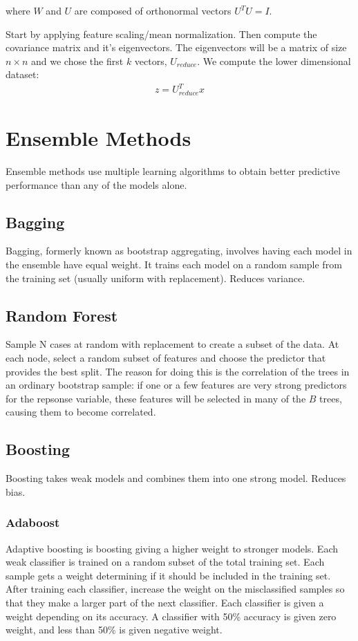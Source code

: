 \documentclass[12pt]{article}
\begin{document}
where $W$ and $U$ are composed of orthonormal vectors $U^TU=I$.  

Start by applying feature scaling/mean normalization. Then compute the covariance matrix and it's eigenvectors. The eigenvectors will be a matrix of size $n\times n$ and we chose the first $k$ vectors, $U_{reduce}$. We compute the lower dimensional dataset:
\begin{align*}
z = U_{reduce}^Tx
\end{align*}

\section{Ensemble Methods}
Ensemble methods use multiple learning algorithms to obtain better predictive performance than any of the models alone.

\subsection{Bagging}
Bagging, formerly known as bootstrap aggregating, involves having each model in the ensemble have equal weight. It trains each model on a random sample from the training set (usually uniform with replacement). Reduces variance.

\subsection{Random Forest}
Sample N cases at random with replacement to create a subset of the data. At each node, select a random subset of features and choose the predictor that provides the best split. The reason for doing this is the correlation of the trees in an ordinary bootstrap sample: if one or a few features are very strong predictors for the repsonse variable, these features will be selected in many of the $B$ trees, causing them to become correlated.

\subsection{Boosting}
Boosting takes weak models and combines them into one strong model. Reduces bias.
\subsubsection{Adaboost}
Adaptive boosting is boosting giving a higher weight to stronger models. Each weak classifier is trained on a random subset of the total training set. Each sample gets a weight determining if it should be included in the training set. After training each classifier, increase the weight on the misclassified samples so that they make a larger part of the next classifier. Each classifier is given a weight depending on its accuracy. A classifier with 50\% accuracy is given zero weight, and less than 50\% is given negative weight.
\end{document}

